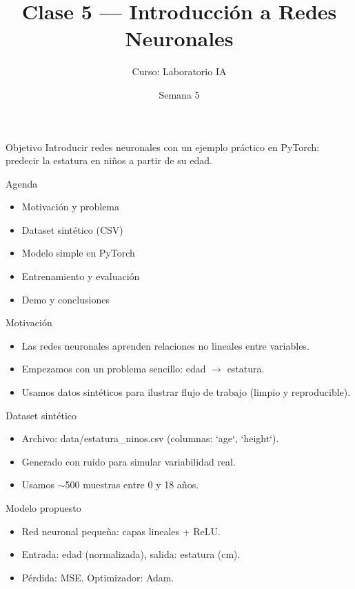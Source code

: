 \documentclass{beamer}
\title{Clase 5 — Introducción a Redes Neuronales}
\author{Curso: Laboratorio IA}
\date{Semana 5}
\begin{document}
\frame{\titlepage}

\begin{frame}{Objetivo}
  Introducir redes neuronales con un ejemplo práctico en PyTorch: predecir la estatura en niños a partir de su edad.
\end{frame}

\begin{frame}{Agenda}
  \begin{itemize}
    \item Motivación y problema
    \item Dataset sintético (CSV)
    \item Modelo simple en PyTorch
    \item Entrenamiento y evaluación
    \item Demo y conclusiones
  \end{itemize}
\end{frame}

\begin{frame}{Motivación}
  \begin{itemize}
    \item Las redes neuronales aprenden relaciones no lineales entre variables.
    \item Empezamos con un problema sencillo: edad $\rightarrow$ estatura.
    \item Usamos datos sintéticos para ilustrar flujo de trabajo (limpio y reproducible).
  \end{itemize}
\end{frame}

\begin{frame}{Dataset sintético}
  \begin{itemize}
    \item Archivo: data/estatura_ninos.csv (columnas: `age`, `height`).
    \item Generado con ruido para simular variabilidad real.
    \item Usamos $\sim$500 muestras entre 0 y 18 años.
  \end{itemize}
\end{frame}

\begin{frame}{Modelo propuesto}
  \begin{itemize}
    \item Red neuronal pequeña: capas lineales + ReLU.
    \item Entrada: edad (normalizada), salida: estatura (cm).
    \item Pérdida: MSE. Optimizador: Adam.
  \end{itemize}
\end{frame}
\end{document}
